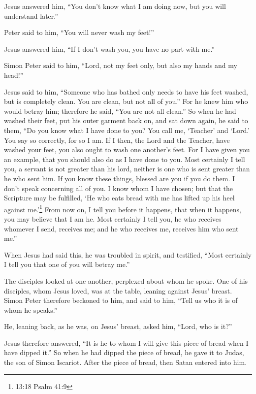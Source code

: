  Jesus answered him, ``You don't know what I am doing now,
but you will understand later.''

 Peter said to him, ``You will never wash my feet!''

Jesus answered him, ``If I don't wash you, you have no part with me.''

 Simon Peter said to him, ``Lord, not my feet only, but also
my hands and my head!''

 Jesus said to him, ``Someone who has bathed only needs to
have his feet washed, but is completely clean. You are clean, but not
all of you.''  For he knew him who would betray him;
therefore he said, ``You are not all clean.''  So when he
had washed their feet, put his outer garment back on, and sat down
again, he said to them, ``Do you know what I have done to you?
 You call me, `Teacher' and `Lord.' You say so correctly,
for so I am.  If I then, the Lord and the Teacher, have
washed your feet, you also ought to wash one another's feet.
 For I have given you an example, that you should also do
as I have done to you.  Most certainly I tell you, a
servant is not greater than his lord, neither is one who is sent greater
than he who sent him.  If you know these things, blessed
are you if you do them.  I don't speak concerning all of
you. I know whom I have chosen; but that the Scripture may be fulfilled,
`He who eats bread with me has lifted up his heel against
me.'\footnote{13:18 Psalm 41:9}  From now on, I tell you
before it happens, that when it happens, you may believe that I am he.
 Most certainly I tell you, he who receives whomever I
send, receives me; and he who receives me, receives him who sent me.''

 When Jesus had said this, he was troubled in spirit, and
testified, ``Most certainly I tell you that one of you will betray me.''

 The disciples looked at one another, perplexed about whom
he spoke.  One of his disciples, whom Jesus loved, was at
the table, leaning against Jesus' breast.  Simon Peter
therefore beckoned to him, and said to him, ``Tell us who it is of whom
he speaks.''

 He, leaning back, as he was, on Jesus' breast, asked him,
``Lord, who is it?''

 Jesus therefore answered, ``It is he to whom I will give
this piece of bread when I have dipped it.'' So when he had dipped the
piece of bread, he gave it to Judas, the son of Simon Iscariot.
 After the piece of bread, then Satan entered into him.

